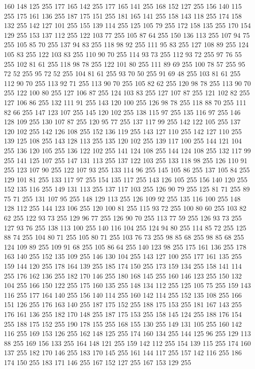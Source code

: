 160 148 125 255 177 165 142 255 177 165 141 255 168 152 127 255 156 140 115 255 175 161 136 255 187 175 151 255 181 165 141 255 158 143 118 255 174 158 132 255 142 127 101 255 155 139 114 255 125 105 79 255 172 158 135 255 170 154 129 255 153 137 112 255 122 103 77 255 105 87 64 255 150 136 113 255 107 94 75 255 105 85 70 255 137 94 83 255 118 98 92 255 111 95 83 255 127 108 89 255 124 105 83 255 122 103 83 255 110 90 70 255 114 93 73 255 112 93 72 255 97 76 55 255 102 81 61 255 118 98 78 255 122 101 80 255 111 89 69 255 100 78 57 255 95 72 52 255 95 72 52 255 104 81 61 255 93 70 50 255 91 69 48 255 103 81 61 255 112 90 70 255 113 92 71 255 113 90 70 255 105 82 62 255 120 98 78 255 113 90 70 255 122 100 80 255 127 106 87 255 124 103 83 255 127 107 87 255 121 102 82 255 127 106 86 255 132 111 91 255 143 120 100 255 126 98 78 255 118 88 70 255 111 82 66 255 147 123 107 255 145 120 102 255 138 115 97 255 135 116 97 255 146 128 109 255
130 107 87 255 120 95 77 255 137 117 99 255 142 122 105 255 137 120 102 255 142 126 108 255 152 136 119 255 143 127 110 255 142 127 110 255 139 125 108 255 143 128 113 255 135 120 102 255 139 117 100 255 144 121 104 255 136 120 105 255 136 122 102 255 141 124 108 255 144 124 108 255 132 117 99 255 141 125 107 255 147 131 113 255 137 122 103 255 133 118 98 255 126 110 91 255 123 107 90 255 122 107 93 255 133 114 96 255 145 105 86 255 137 105 84 255 129 101 81 255 133 117 97 255 154 135 117 255 143 126 105 255 156 140 120 255 152 135 116 255 149 131 113 255 137 117 103 255 126 90 79 255 125 81 71 255 89 75 71 255 131 107 95 255 148 129 113 255 126 109 92 255 135 116 100 255 148 128 112 255 144 123 106 255 120 100 81 255 115 93 72 255 100 80 60 255 103 82 62 255 122 93 73 255 129 96 77 255 126 90 70 255 113 77 59 255 126 93 73 255 127 93 76 255 138 113 100 255 140 116 104 255 124 94 80 255 114 85 72 255 125 88 74 255 104 80 71 255 105 80 71 255 103 76 73 255
98 85 68 255 98 85 68 255 124 109 89 255 109 91 68 255 105 86 64 255 140 123 98 255 175 161 136 255 178 163 140 255 152 135 109 255 146 130 104 255 143 127 100 255 177 161 135 255 159 144 120 255 178 164 139 255 185 174 150 255 173 159 134 255 158 141 114 255 176 162 136 255 182 170 146 255 180 168 145 255 160 146 123 255 150 132 104 255 166 150 122 255 175 160 135 255 148 134 112 255 125 105 75 255 159 143 116 255 177 164 140 255 156 140 114 255 160 142 114 255 152 135 108 255 166 151 126 255 176 163 140 255 187 175 152 255 188 175 153 255 181 167 143 255 176 161 136 255 182 170 148 255 187 175 153 255 158 145 124 255 188 176 154 255 188 175 152 255 190 178 155 255 168 155 130 255 149 131 105 255 160 142 116 255 169 153 126 255 162 148 125 255 174 160 134 255 144 125 96 255 129 113 88 255 169 156 133 255 164 148 121 255 159 142 112 255 154 139 115 255 174 160 137 255 182 170 146 255 183 170 145 255 161 144 117 255 157 142 116 255 186 174 150 255 183 171 146 255 167 152 127 255 167 153 129 255
